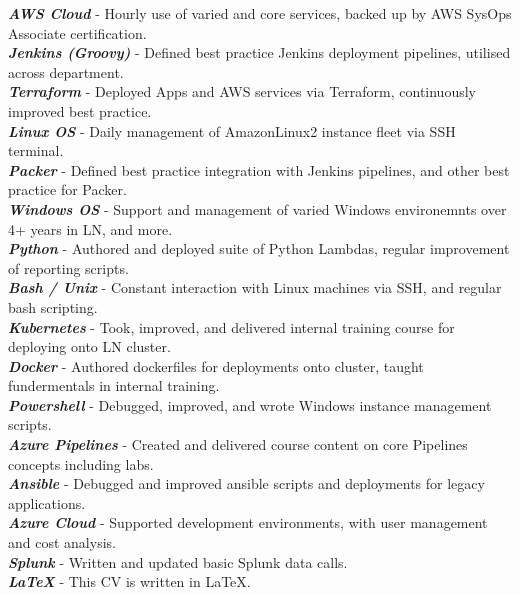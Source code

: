 \documentclass[10pt]{article} %
\begin{document}
{
  \textit{\textbf{AWS Cloud}} - Hourly use of varied and core services, backed up by AWS SysOps Associate certification. \\
  \textit{\textbf{Jenkins (Groovy)}} - Defined best practice Jenkins deployment pipelines, utilised across department. \\
  \textit{\textbf{Terraform}} - Deployed Apps and AWS services via Terraform, continuously improved best practice. \\
  \textit{\textbf{Linux OS}} - Daily management of AmazonLinux2 instance fleet via SSH terminal. \\
  \textit{\textbf{Packer}} - Defined best practice integration with Jenkins pipelines, and other best practice for Packer. \\
  \textit{\textbf{Windows OS}} - Support and management of varied Windows environemnts over 4+ years in LN, and more. \\
  \textit{\textbf{Python}} - Authored and deployed suite of Python Lambdas, regular improvement of reporting scripts. \\
  \textit{\textbf{Bash / Unix}} - Constant interaction with Linux machines via SSH, and regular bash scripting. \\
  \textit{\textbf{Kubernetes}} - Took, improved, and delivered internal training course for deploying onto LN cluster. \\
  \textit{\textbf{Docker}} - Authored dockerfiles for deployments onto cluster, taught fundermentals in internal training. \\
  \textit{\textbf{Powershell}} - Debugged, improved, and wrote Windows instance management scripts. \\
  \textit{\textbf{Azure Pipelines}} - Created and delivered course content on core Pipelines concepts including labs. \\
  \textit{\textbf{Ansible}} - Debugged and improved ansible scripts and deployments for legacy applications. \\
  \textit{\textbf{Azure Cloud}} - Supported development environments, with user management and cost analysis. \\
  \textit{\textbf{Splunk}} - Written and updated basic Splunk data calls. \\
  \textit{\textbf{LaTeX}} - This CV is written in LaTeX. \\
}
\end{document}
